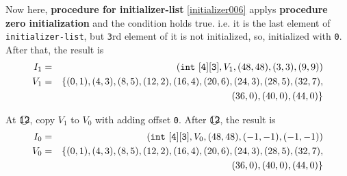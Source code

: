 \begin{Example}
Now here,  {\bf procedure for initializer-list}
 \ref{initializer006} applys {\bf procedure zero initialization}
and the condition holds true. i.e. it is the last element of
 {\tt{initializer-list}}, but {\tt{3}}rd element of it is not
 initialized, so, initialized with {\tt{0}}.
After that, the result is
\begin{eqnarray*}
I_1 & = & ({\tt{int\,\,[4][3]}},V_1,(48,48),(3,3),(9,9)) \\
V_1 & = & \{
 (0,1),(4,3),(8,5),(12,2),(16,4),(20,6),(24,3),(28,5),(32,7), \\
    &   &  (36,0), (40,0), (44,0) \}
\end{eqnarray*}

\noindent
At $\MARU{\tt 12}$, copy $V_1$ to $V_0$ with adding offset {\tt{0}}.
After $\MARU{\tt 12}$, the result is
\begin{eqnarray*}
I_0 & = & ({\tt{int\,\,[4][3]}},V_0,(48,48),(-1,-1),(-1,-1)) \\
V_0 & = & \{
 (0,1),(4,3),(8,5),(12,2),(16,4),(20,6),(24,3),(28,5),(32,7), \\
    &   &  (36,0), (40,0), (44,0) \}
\end{eqnarray*}

\end{Example}


